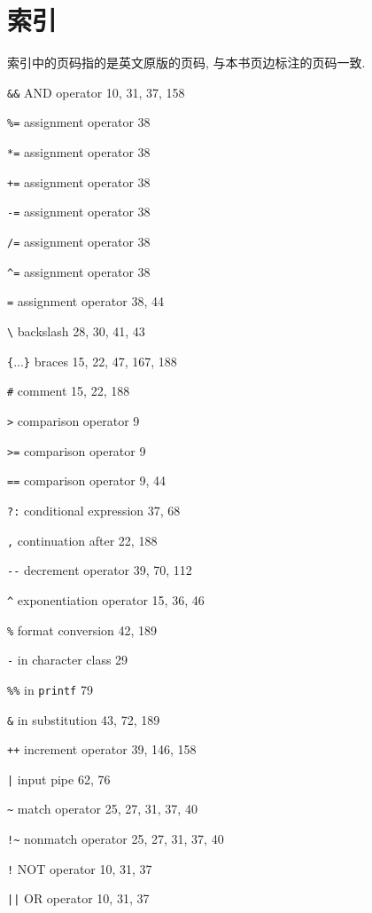 \chapter{索引}
\label{chap:index}

索引中的页码指的是英文原版的页码, 与本书页边标注的页码一致.

\begin{multicols}{3}
\footnotesize
\verb'&&' AND operator 10, 31, 37, 158

\verb'%=' assignment operator 38

\verb'*=' assignment operator 38 

\verb'+=' assignment operator 38

\verb'-=' assignment operator 38

\verb'/=' assignment operator 38

\verb'^=' assignment operator 38 

\verb'=' assignment operator 38, 44

\verb'\' backslash 28, 30, 41, 43

\verb'{'...\verb'}' braces 15, 22, 47, 167, 188

\verb'#' comment 15, 22, 188 

\verb'>' comparison operator 9

\verb'>=' comparison operator 9

\verb'==' comparison operator 9, 44 

\verb'?:' conditional expression 37, 68 

\verb',' continuation after 22, 188 

\verb'--' decrement operator 39, 70, 112

\verb'^' exponentiation operator 15, 36, 46

\verb'%' format conversion 42, 189

\verb'-' in character class 29

\verb'%%' in \verb'printf' 79

\verb'&' in substitution 43, 72, 189

\verb'++' increment operator 39, 146, 158

\verb'|' input pipe 62, 76

\verb'~' match operator 25, 27, 31, 37, 40 

\verb'!~' nonmatch operator 25, 27, 31, 37, 40

\verb'!' NOT operator 10, 31, 37

\verb'||' OR operator 10, 31, 37 


\end{multicols}
